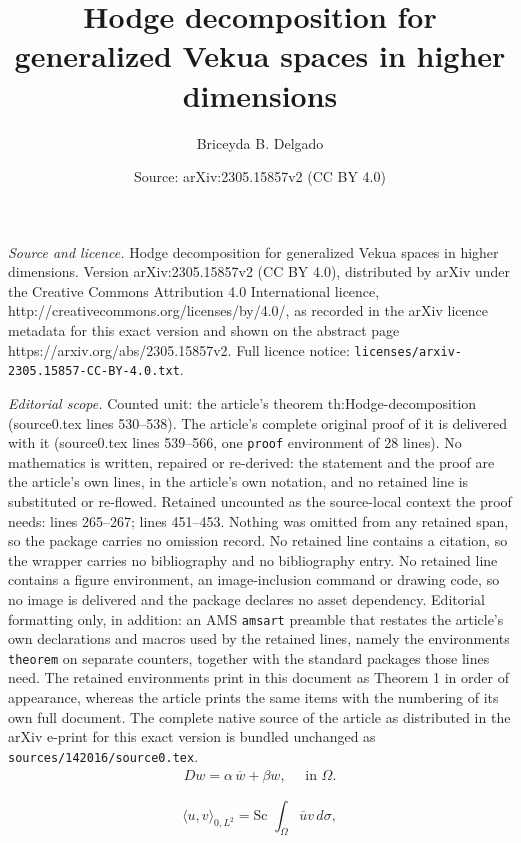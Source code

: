 \documentclass[10pt,a4paper]{amsart}
\title{Hodge decomposition for generalized Vekua spaces in higher dimensions}
\author{Briceyda B. Delgado}
\date{Source: arXiv:2305.15857v2 (CC BY 4.0)}
\begin{document}
\maketitle

\noindent\emph{Source and licence.} Hodge decomposition for generalized Vekua spaces in higher dimensions. Version arXiv:2305.15857v2 (CC BY 4.0), distributed by arXiv under the Creative Commons Attribution 4.0 International licence, http://creativecommons.org/licenses/by/4.0/, as recorded in the arXiv licence metadata for this exact version and shown on the abstract page https://arxiv.org/abs/2305.15857v2. Full licence notice: \texttt{licenses/arxiv-2305.15857-CC-BY-4.0.txt}.\par\smallskip

\noindent\textit{Editorial scope.} Counted unit: the article's theorem th:Hodge-decomposition (source0.tex lines 530--538). The article's complete original proof of it is delivered with it (source0.tex lines 539--566, one \texttt{proof} environment of 28 lines). No mathematics is written, repaired or re-derived: the statement and the proof are the article's own lines, in the article's own notation, and no retained line is substituted or re-flowed.  Retained uncounted as the source-local context the proof needs: lines 265--267; lines 451--453.  Nothing was omitted from any retained span, so the package carries no omission record.  No retained line contains a citation, so the wrapper carries no bibliography and no bibliography entry.  No retained line contains a figure environment, an image-inclusion command or drawing code, so no image is delivered and the package declares no asset dependency.  Editorial formatting only, in addition: an AMS \texttt{amsart} preamble that restates the article's own declarations and macros used by the retained lines, namely the environments \texttt{theorem} on separate counters, together with the standard packages those lines need.  The retained environments print in this document as Theorem 1 in order of appearance, whereas the article prints the same items with the numbering of its own full document.  The complete native source of the article as distributed in the arXiv e-print for this exact version is bundled unchanged as \texttt{sources/142016/source0.tex}.
\begin{align}\label{eq:Vekua_equation}
   D w=\alpha\, \overline{w}+\beta w, \quad \text{ in }\Omega.
\end{align}

\begin{equation}\label{eq:scalar-product}
   \langle u,v\rangle_{0,L^2}=\text{Sc }\int_{\Omega} \overline{u}v\, d\sigma, 
\end{equation}
\end{document}
